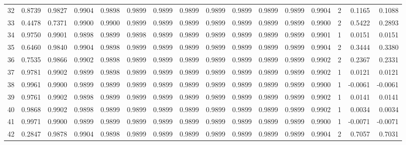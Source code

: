 \begin{tabular}{lrrrrrrrrrrrrrrr}
32  &      0.8739 &  0.9827 &  0.9904 &  0.9898 &  0.9899 &  0.9899 &  0.9899 &  0.9899 &  0.9899 &  0.9899 &   0.9899 &     0.9904 &      2 &                    0.1165 &                     0.1088 \\
33  &      0.4478 &  0.7371 &  0.9900 &  0.9900 &  0.9899 &  0.9899 &  0.9899 &  0.9899 &  0.9899 &  0.9899 &   0.9899 &     0.9900 &      2 &                    0.5422 &                     0.2893 \\
34  &      0.9750 &  0.9901 &  0.9898 &  0.9899 &  0.9898 &  0.9899 &  0.9899 &  0.9899 &  0.9899 &  0.9899 &   0.9899 &     0.9901 &      1 &                    0.0151 &                     0.0151 \\
35  &      0.6460 &  0.9840 &  0.9904 &  0.9898 &  0.9899 &  0.9899 &  0.9899 &  0.9899 &  0.9899 &  0.9899 &   0.9899 &     0.9904 &      2 &                    0.3444 &                     0.3380 \\
36  &      0.7535 &  0.9866 &  0.9902 &  0.9898 &  0.9899 &  0.9899 &  0.9899 &  0.9899 &  0.9899 &  0.9899 &   0.9899 &     0.9902 &      2 &                    0.2367 &                     0.2331 \\
37  &      0.9781 &  0.9902 &  0.9899 &  0.9898 &  0.9899 &  0.9899 &  0.9899 &  0.9899 &  0.9899 &  0.9899 &   0.9899 &     0.9902 &      1 &                    0.0121 &                     0.0121 \\
38  &      0.9961 &  0.9900 &  0.9899 &  0.9899 &  0.9899 &  0.9899 &  0.9899 &  0.9899 &  0.9899 &  0.9899 &   0.9899 &     0.9900 &      1 &                   -0.0061 &                    -0.0061 \\
39  &      0.9761 &  0.9902 &  0.9898 &  0.9899 &  0.9899 &  0.9899 &  0.9899 &  0.9899 &  0.9899 &  0.9899 &   0.9899 &     0.9902 &      1 &                    0.0141 &                     0.0141 \\
40  &      0.9868 &  0.9902 &  0.9898 &  0.9899 &  0.9899 &  0.9899 &  0.9899 &  0.9899 &  0.9899 &  0.9899 &   0.9899 &     0.9902 &      1 &                    0.0034 &                     0.0034 \\
41  &      0.9971 &  0.9900 &  0.9899 &  0.9899 &  0.9899 &  0.9899 &  0.9899 &  0.9899 &  0.9899 &  0.9899 &   0.9899 &     0.9900 &      1 &                   -0.0071 &                    -0.0071 \\
42  &      0.2847 &  0.9878 &  0.9904 &  0.9898 &  0.9899 &  0.9899 &  0.9899 &  0.9899 &  0.9899 &  0.9899 &   0.9899 &     0.9904 &      2 &                    0.7057 &                     0.7031 \\

\end{tabular}
